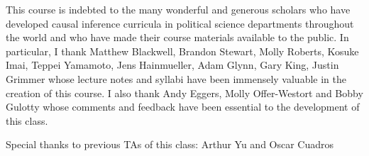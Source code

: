 \documentclass[11pt, article, oneside]{memoir}
\theoremstyle{Assumption}
\begin{document}
This course is indebted to the many wonderful and generous scholars who have developed causal inference curricula in political science departments throughout the world and who have made their course materials available to the public. In particular, I thank Matthew Blackwell, Brandon Stewart, Molly Roberts, Kosuke Imai, Teppei Yamamoto, Jens Hainmueller, Adam Glynn, Gary King, Justin Grimmer whose lecture notes and syllabi have been immensely valuable in the creation of this course. I also thank Andy Eggers, Molly Offer-Westort and Bobby Gulotty whose comments and feedback have been essential to the development of this class.

Special thanks to previous TAs of this class: Arthur Yu and Oscar Cuadros
\end{document}
